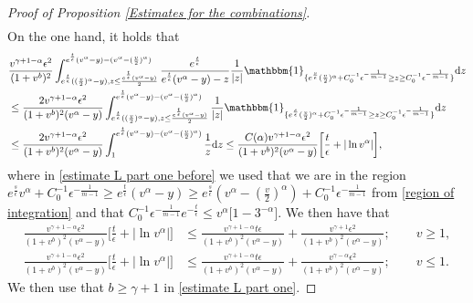 \documentclass[11pt]{article}
\numberwithin{equation}{section}
\newcommand{\der}{\textup{d}}
\begin{document}
\begin{proof}[Proof of Proposition \ref{Estimates for the combinations}]
\begin{align}
\end{align}
On the one hand, it holds that
\begin{align}
 &  \frac{ v^{\gamma+1-\alpha}\epsilon^{2} }{(1+v^{b})^{2}}\int_{e^{\frac{t}{\epsilon}}((\frac{v}{2})^{\alpha}-y), z\leq \frac{e^{\frac{t}{\epsilon}}(v^{\alpha}-y)}{2}}^{e^{\frac{t}{\epsilon}}(v^{\alpha}-y)-(v^{\alpha}-(\frac{v}{2})^{\alpha})}\frac{e^{\frac{t}{\epsilon}}}{e^{\frac{t}{\epsilon}}(v^{\alpha}-y)-z}\frac{1}{|z|} \mathbbm{1}_{\{e^{\frac{s}{\epsilon}}(\frac{v}{2})^{\alpha}+C_{0}^{-1}\epsilon^{-\frac{1}{m-1}}\geq z\geq C_{0}^{-1}\epsilon^{-\frac{1}{m-1}}\}}\der z\nonumber\\
   &\leq \frac{2 v^{\gamma+1-\alpha}\epsilon^{2} }{(1+v^{b})^{2}(v^{\alpha}-y)}\int_{e^{\frac{t}{\epsilon}}((\frac{v}{2})^{\alpha}-y), z\leq \frac{e^{\frac{t}{\epsilon}}(v^{\alpha}-y)}{2}}^{e^{\frac{t}{\epsilon}}(v^{\alpha}-y)-(v^{\alpha}-(\frac{v}{2})^{\alpha})}\frac{1}{|z|} \mathbbm{1}_{\{e^{\frac{s}{\epsilon}}(\frac{v}{2})^{\alpha}+C_{0}^{-1}\epsilon^{-\frac{1}{m-1}}\geq z\geq C_{0}^{-1}\epsilon^{-\frac{1}{m-1}}\}}\der z\nonumber\\
      &\leq \frac{2 v^{\gamma+1-\alpha}\epsilon^{2} }{(1+v^{b})^{2}(v^{\alpha}-y)}\int_{1}^{e^{\frac{t}{\epsilon}}(v^{\alpha}-y)-(v^{\alpha}-(\frac{v}{2})^{\alpha})}\frac{1}{z} \der z\leq \frac{C(\alpha) v^{\gamma+1-\alpha}\epsilon^{2} }{(1+v^{b})^{2}(v^{\alpha}-y)}\bigg[\frac{t}{\epsilon}+|\ln{v^{\alpha}}|\bigg]\label{estimate L part one before},
      \end{align}
      where in \eqref{estimate L part one before} we used that we are in the region $e^{\frac{s}{\epsilon}}v^{\alpha}+C_{0}^{-1}\epsilon^{-\frac{1}{m-1}}\geq e^{\frac{t}{\epsilon}}(v^{\alpha}-y)\geq e^{\frac{s}{\epsilon}}(v^{\alpha}-(\frac{v}{2})^{\alpha})+C_{0}^{-1}\epsilon^{-\frac{1}{m-1}}$ from \eqref{region of integration} and that $C_{0}^{-1}\epsilon^{-\frac{1}{m-1}}e^{-\frac{t}{\epsilon}}\leq v^{\alpha}\big[1-3^{-\alpha}\big]$. We then have that
      \begin{align}
   \frac{ v^{\gamma+1-\alpha}\epsilon^{2} }{(1+v^{b})^{2}(v^{\alpha}-y)}\bigg[\frac{t}{\epsilon}+|\ln{v^{\alpha}}|\bigg]   & \leq \frac{ v^{\gamma+1-\alpha}t \epsilon }{(1+v^{b})^{2}(v^{\alpha}-y)}+\frac{ v^{\gamma+1} \epsilon^{2} }{(1+v^{b})^{2}(v^{\alpha}-y)}; \qquad v\geq 1,\label{estimate L part one}\\
     \frac{ v^{\gamma+1-\alpha}\epsilon^{2} }{(1+v^{b})^{2}(v^{\alpha}-y)}\bigg[\frac{t}{\epsilon}+|\ln{v^{\alpha}}|\bigg]   & \leq \frac{ v^{\gamma+1-\alpha}t \epsilon }{(1+v^{b})^{2}(v^{\alpha}-y)}+\frac{ v^{\gamma-\alpha} \epsilon^{2} }{(1+v^{b})^{2}(v^{\alpha}-y)}; \qquad v\leq 1.
\end{align}
 We then use that $b\geq \gamma+1$ in \eqref{estimate L part one}.


\end{proof}
\end{document}
